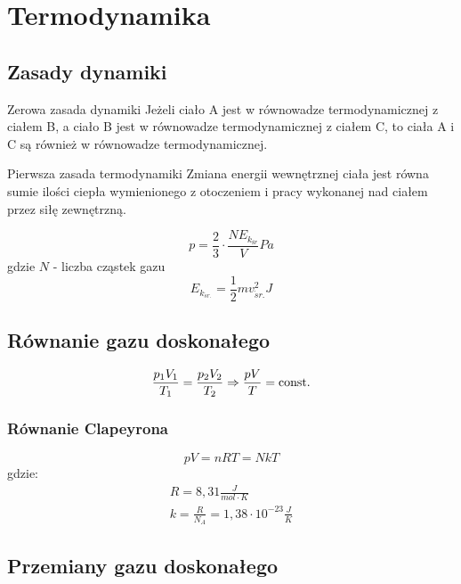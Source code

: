\chapter{Termodynamika}

  \section{Zasady dynamiki}
    \begin{law}{Zerowa zasada dynamiki}
      Jeżeli ciało A jest w równowadze termodynamicznej z ciałem B, a ciało B jest w równowadze termodynamicznej z ciałem C, to ciała A i C są również w równowadze termodynamicznej.
    \end{law}
    \begin{law}{Pierwsza zasada termodynamiki}
      Zmiana energii wewnętrznej ciała jest równa sumie ilości ciepła wymienionego z otoczeniem i pracy wykonanej nad ciałem przez siłę zewnętrzną.
    \end{law}
    \begin{equation}
      p = \frac 23\cdot\frac{NE_{k_{\textit{śr}}}}{V} \unit{Pa}
    \end{equation}
    gdzie $N$ - liczba cząstek gazu
    \begin{equation}
      E_{k_{\acute sr.}} = \frac{1}{2}mv_{\acute sr.}^2 \unit{J}
    \end{equation}
  \section{Równanie gazu doskonałego}
    \begin{equation}
      \frac{p_1V_1}{T_1} = \frac{p_2V_2}{T_2} \Rightarrow \frac{pV}{T} = \operatorname{const.}
    \end{equation}
    \subsection{Równanie Clapeyrona}
      \begin{equation}
        pV = nRT = NkT
      \end{equation}
      gdzie:
      \begin{gather}
        R =  8,31 \unit{\frac{J}{mol\cdot K}}\\
        k = \frac{R}{N_A} = 1,38\cdot 10^{-23} \unit{\frac{J}{K}}
      \end{gather}
  \section{Przemiany gazu doskonałego}

